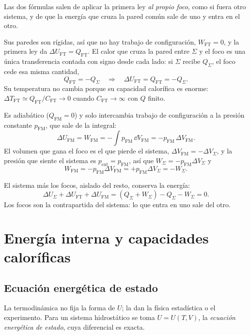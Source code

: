 Las dos fórmulas salen de aplicar la primera ley \emph{al propio foco}, como si fuera otro sistema, y de
que la energía que cruza la pared común sale de uno y entra en el otro.

 Sus paredes son rígidas, así que no hay trabajo de configuración, $W_{\mathrm{FT}}=0$, y
la primera ley da $\Delta U_{\mathrm{FT}}=Q_{\mathrm{FT}}$. El calor que cruza la pared entre $\Sigma$ y el foco es
una única transferencia contada con signo desde cada lado: si $\Sigma$ recibe $Q_\Sigma$, el foco cede esa misma
cantidad,
\[
  Q_{\mathrm{FT}}=-Q_\Sigma\quad\Longrightarrow\quad\Delta U_{\mathrm{FT}}=Q_{\mathrm{FT}}=-Q_\Sigma .
\]
Su temperatura no cambia porque su capacidad calorífica es enorme: $\Delta T_{\mathrm{FT}}\simeq
Q_{\mathrm{FT}}/C_{\mathrm{FT}}\to0$ cuando $C_{\mathrm{FT}}\to\infty$ con $Q$ finito.

 Es adiabático ($Q_{\mathrm{FM}}=0$) y solo intercambia trabajo de configuración a la
presión constante $p_{\mathrm{FM}}$, que sale de la integral:
\[
  \Delta U_{\mathrm{FM}}=W_{\mathrm{FM}}=-\int p_{\mathrm{FM}}\,\dd V_{\mathrm{FM}}=-p_{\mathrm{FM}}\,\Delta V_{\mathrm{FM}} .
\]
El volumen que gana el foco es el que pierde el sistema, $\Delta V_{\mathrm{FM}}=-\Delta V_\Sigma$, y la presión
que siente el sistema es $p_{\mathrm{ext}}=p_{\mathrm{FM}}$, así que $W_\Sigma=-p_{\mathrm{FM}}\Delta V_\Sigma$ y
\[
  W_{\mathrm{FM}}=-p_{\mathrm{FM}}\Delta V_{\mathrm{FM}}=+p_{\mathrm{FM}}\Delta V_\Sigma=-W_\Sigma .
\]

 El sistema más los focos, aislado del resto, conserva la energía:
\[
  \Delta U_\Sigma+\Delta U_{\mathrm{FT}}+\Delta U_{\mathrm{FM}}=(Q_\Sigma+W_\Sigma)-Q_\Sigma-W_\Sigma=0 .
\]
Los focos son la contrapartida del sistema: lo que entra en uno sale del otro.

\section{Energía interna y capacidades caloríficas}

\subsection{Ecuación energética de estado}

La termodinámica no fija la forma de $U$; la dan la física estadística o el experimento. Para un sistema
hidrostático se toma $U=U(T,V)$, la \emph{ecuación energética de estado}, cuya diferencial es exacta.

